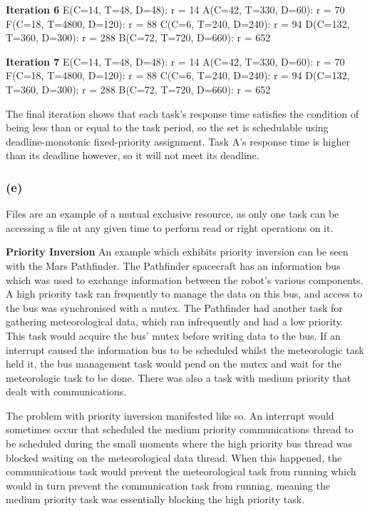 \documentclass[]{report}
\begin{document}
			\textbf{Iteration 6}
			E(C=14, T=48, D=48): r = 14
			A(C=42, T=330, D=60): r = 70
			F(C=18, T=4800, D=120): r = 88
			C(C=6, T=240, D=240): r = 94
			D(C=132, T=360, D=300): r = 288
			B(C=72, T=720, D=660): r = 652


			\textbf{Iteration 7}
			E(C=14, T=48, D=48): r = 14
			A(C=42, T=330, D=60): r = 70
			F(C=18, T=4800, D=120): r = 88
			C(C=6, T=240, D=240): r = 94
			D(C=132, T=360, D=300): r = 288
			B(C=72, T=720, D=660): r = 652
		
			The final iteration shows that each task's response time satisfies the condition of being less than or equal to the task period, so the set is schedulable using deadline-monotonic fixed-priority assignment. Task A's response time is higher than its deadline however, so it will not meet its deadline.
			
			\subsubsection{(e)}
			Files are an example of a mutual exclusive resource, as only one task can be accessing a file at any given time to perform read or right operations on it. 

\textbf{Priority Inversion}
An example which exhibits priority inversion can be seen with the Mars Pathfinder. The Pathfinder spacecraft has an information bus which was used to exchange information between the robot's various components. A high priority task ran frequently to manage the data on this bus, and access to the bus was synchronised with a mutex. The Pathfinder had another task for gathering meteorological data, which ran infrequently and had a low priority.  This task would acquire the bus' mutex before writing data to the bus. If an interrupt caused the information bus to be scheduled whilst the meteorologic task held it, the bus management task would pend on the mutex and wait for the meteorologic task to be done.  There was also a task with medium priority that dealt with communications. 

The problem with priority inversion manifested like so. An interrupt would sometimes occur that scheduled the medium priority communications thread to be scheduled during the small moments where the high priority bus thread was blocked waiting on the meteorological data thread. When this happened, the communications task would prevent the meteorological task from running which would in turn prevent the communication task from running, meaning the medium priority task was essentially blocking the high priority task\cite{jones1997really}.
\end{document}
